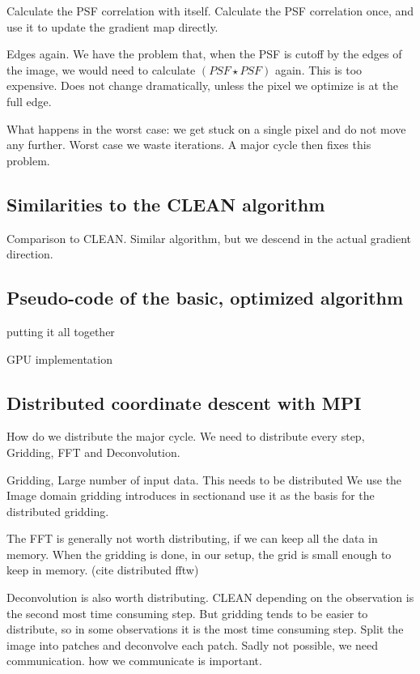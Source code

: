 Calculate the PSF correlation with itself. Calculate the PSF correlation once, and use it to update the gradient map directly.

Edges again. We have the problem that, when the PSF is cutoff by the edges of the image, we would need to calculate $(PSF \star PSF)$ again. This is too expensive. Does not change dramatically, unless the pixel we optimize is at the full edge.

What happens in the worst case: we get stuck on a single pixel and do not move any further. Worst case we waste iterations.
A major cycle then fixes this problem.

\subsection{Similarities to the CLEAN algorithm}

Comparison to CLEAN. Similar algorithm, but we descend in the actual gradient direction.

\subsection{Pseudo-code of the basic, optimized algorithm}

putting it all together




GPU implementation




\subsection{Distributed coordinate descent with MPI}
How do we distribute the major cycle. We need to distribute every step, Gridding, FFT and Deconvolution.

Gridding, Large number of input data. This needs to be distributed
We use the Image domain gridding introduces in sectionand use it as the basis for the distributed gridding.

The FFT is generally not worth distributing, if we can keep all the data in memory. When the gridding is done, in our setup, the grid is small enough to keep in memory. (cite distributed fftw)

Deconvolution is also worth distributing. CLEAN depending on the observation is the second most time consuming step. But gridding tends to be easier to distribute, so in some observations it is the most time consuming step.
Split the image into patches and deconvolve each patch.
Sadly not possible, we need communication. how we communicate is important.

